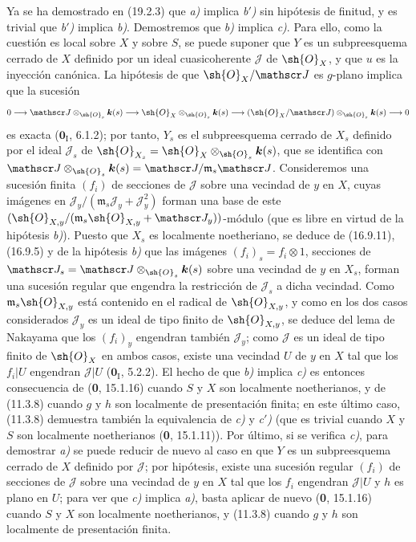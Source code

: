 Ya se ha demostrado en (19.2.3) que \emph{a)} implica \emph{b$'$)} sin hipótesis de finitud, y es trivial que \emph{b$'$)} implica \emph{b)}. Demostremos que \emph{b)} implica \emph{c)}. Para ello, como la cuestión es local sobre $X$ y sobre $S$, se puede suponer que $Y$ es un subpreesquema cerrado de $X$ definido por un ideal cuasicoherente $\mathscr J$ de $\sh{O}_X$, y que $u$ es la inyección canónica. La hipótesis de que $\sh{O}_X/\mathscr J$ es $g$-plano implica que la sucesión
\[
  0\longrightarrow\mathscr J\otimes_{\sh{O}_s}\boldsymbol{k}(s)\longrightarrow\sh{O}_X\otimes_{\sh{O}_s}\boldsymbol{k}(s)\longrightarrow(\sh{O}_X/\mathscr J)\otimes_{\sh{O}_s}\boldsymbol{k}(s)\longrightarrow0
\]
es exacta ($\mathbf{0}_{\mathrm I}$, 6.1.2); por tanto, $Y_s$ es el subpreesquema cerrado de $X_s$ definido por el ideal $\mathscr J_s$ de $\sh{O}_{X_s}=\sh{O}_X\otimes_{\sh{O}_s}\boldsymbol{k}(s)$, que se identifica con $\mathscr J\otimes_{\sh{O}_s}\boldsymbol{k}(s)=\mathscr J/\mathfrak m_s\mathscr J$. Consideremos una sucesión finita $(f_i)$ de secciones de $\mathscr J$ sobre una vecindad de $y$ en $X$, cuyas imágenes en
$\mathscr J_y/(\mathfrak m_s\mathscr J_y+\mathscr J_y^2)$
forman una base de este $(\sh{O}_{X,y}/(\mathfrak m_s\sh{O}_{X,y}+\mathscr J_y))$-módulo (que es libre en virtud de la hipótesis \emph{b)}). Puesto que $X_s$ es localmente noetheriano, se deduce de (16.9.11), (16.9.5) y de la hipótesis \emph{b)} que las imágenes $(f_i)_s=f_i\otimes1$, secciones de $\mathscr J_s=\mathscr J\otimes_{\sh{O}_s}\boldsymbol{k}(s)$ sobre una vecindad de $y$ en $X_s$, forman una sucesión regular que engendra la restricción de $\mathscr J_s$ a dicha vecindad. Como $\mathfrak m_s\sh{O}_{X,y}$ está contenido en el radical de $\sh{O}_{X,y}$, y como en los dos casos considerados $\mathscr J_y$ es un ideal de tipo finito de $\sh{O}_{X,y}$, se deduce del lema de Nakayama que los $(f_i)_y$ engendran también $\mathscr J_y$; como $\mathscr J$ es un ideal de tipo finito de $\sh{O}_X$ en ambos casos, existe una vecindad $U$ de $y$ en $X$ tal que los $f_i|U$ engendran $\mathscr J|U$ ($\mathbf{0}_{\mathrm I}$, 5.2.2). El hecho de que \emph{b)} implica \emph{c)} es entonces consecuencia de (\textbf{0}, 15.1.16) cuando $S$ y $X$ son localmente noetherianos, y de (11.3.8) cuando $g$ y $h$ son localmente de presentación finita; en este último caso, (11.3.8) demuestra también la equivalencia de \emph{c)} y \emph{c$'$)} (que es trivial cuando $X$ y $S$ son localmente noetherianos (\textbf{0}, 15.1.11)). Por último, si se verifica \emph{c)}, para demostrar \emph{a)} se puede reducir de nuevo al caso en que $Y$ es un subpreesquema cerrado de $X$ definido por $\mathscr J$; por hipótesis, existe una sucesión regular $(f_i)$ de secciones de $\mathscr J$ sobre una vecindad de $y$ en $X$ tal que los $f_i$ engendran $\mathscr J|U$ y $h$ es plano en $U$; para ver que \emph{c)} implica \emph{a)}, basta aplicar de nuevo (\textbf{0}, 15.1.16) cuando $S$ y $X$ son localmente noetherianos, y (11.3.8) cuando $g$ y $h$ son localmente de presentación finita.


